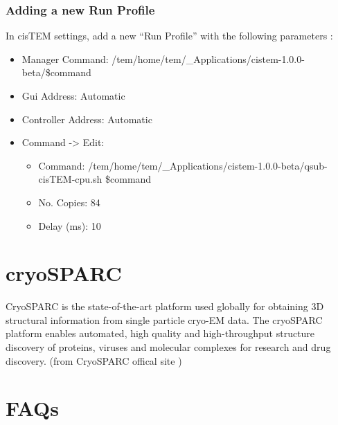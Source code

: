 \documentclass[letterpaper,10pt,english]{sphinxmanual}
\begin{document}
\subsection{Adding a new Run Profile}
\label{\detokenize{cisTEM:adding-a-new-run-profile}}
In cisTEM settings, add a new “Run Profile” with the following parameters :
\begin{itemize}
\item {} 
Manager Command: /tem/home/tem/\_Applications/cistem-1.0.0-beta/\$command

\item {} 
Gui Address: Automatic

\item {} 
Controller Address: Automatic

\item {} 
Command -\textgreater{} Edit:
\begin{itemize}
\item {} 
Command: /tem/home/tem/\_Applications/cistem-1.0.0-beta/qsub-cisTEM-cpu.sh  \$command

\item {} 
No. Copies: 84

\item {} 
Delay (ms): 10

\end{itemize}

\end{itemize}



\chapter{cryoSPARC}
\label{\detokenize{cryoSPARC:cryosparc}}\label{\detokenize{cryoSPARC::doc}}
CryoSPARC is the state-of-the-art platform used globally for obtaining 3D structural information from single particle cryo-EM data. The cryoSPARC platform enables automated, high quality and high-throughput structure discovery of proteins, viruses and molecular complexes for research and drug discovery. (from CryoSPARC offical site )


\chapter{FAQs}
\label{\detokenize{faq:faqs}}\label{\detokenize{faq::doc}}
\end{document}
